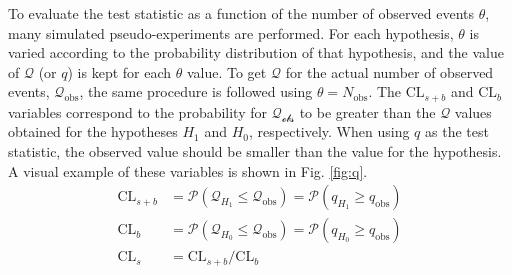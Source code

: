 \documentclass[12pt]{thesis}  %
\begin{document}
To evaluate the test statistic as a function of the number of observed events $\theta$, many simulated pseudo-experiments are performed. For each hypothesis, $\theta$ is varied according to the probability distribution of that hypothesis, and the value of $\mathcal{Q}$ (or $q$) is kept for each $\theta$ value. To get $\mathcal{Q}$ for the actual number of observed events, $\mathcal{Q}_{\text{obs}}$, the same procedure is followed using $\theta=N_{\text{obs}}$. The $\text{CL}_{s+b}$ and $\text{CL}_{b}$ variables correspond to the probability for $\mathcal{Q_{\text{obs}}}$ to be greater than the $\mathcal{Q}$ values obtained for the hypotheses $H_1$ and $H_0$, respectively. When using $q$ as the test statistic, the observed value should be smaller than the value for the hypothesis. A visual example of these variables is shown in Fig. \ref{fig:q}.
\begin{align}
\text{CL}_{s+b} &= \mathcal{P}(\mathcal{Q}_{H_{1}} \leq \mathcal{Q}_{\text{obs}}) = \mathcal{P}(q_{H_{1}} \geq q_{\text{obs}}) \\
\text{CL}_{b} &= \mathcal{P}(\mathcal{Q}_{H_{0}} \leq \mathcal{Q}_{\text{obs}}) = \mathcal{P}(q_{H_{0}} \geq q_{\text{obs}}) \\
\text{CL}_{s} &= \text{CL}_{s+b}/\text{CL}_{b}
\end{align}
\end{document}
